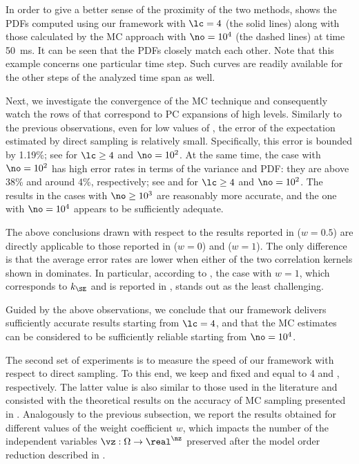 In order to give a better sense of the proximity of the two methods,
 shows the \acp{PDF} computed using our
framework with $\lc = 4$ (the solid lines) along with those calculated by the
\ac{MC} approach with $\no = 10^4$ (the dashed lines) at time 50~ms. It can be
seen that the \acp{PDF} closely match each other. Note that this example
concerns one particular time step. Such curves are readily available for the
other steps of the analyzed time span as well.

Next, we investigate the convergence of the \ac{MC} technique and consequently
watch the rows of  that correspond to \ac{PC}
expansions of high levels. Similarly to the previous observations, even for low
values of \no, the error of the expectation estimated by direct sampling is
relatively small. Specifically, this error is bounded by 1.19\%; see
\error{\expectation} for $\lc \geq 4$ and $\no = 10^2$. At the same time, the
case with $\no = 10^2$ has high error rates in terms of the variance and
\ac{PDF}: they are above 38\% and around 4\%, respectively; see
\error{\variance} and  for $\lc \geq 4$ and $\no = 10^2$. The results
in the cases with $\no \geq 10^3$ are reasonably more accurate, and the one with
$\no = 10^4$ appears to be sufficiently adequate.

The above conclusions drawn with respect to the results reported in
 ($w = 0.5$) are directly applicable to those
reported in  ($w = 0$) and
 ($w = 1$). The only difference is that the
average error rates are lower when either of the two correlation kernels shown
in  dominates. In particular, according to
\error{\variance}, the case with $w = 1$, which corresponds to $k_\SE$ and is
reported in , stands out as the least
challenging.

Guided by the above observations, we conclude that our framework delivers
sufficiently accurate results starting from $\lc = 4$, and that the \ac{MC}
estimates can be considered to be sufficiently reliable starting from $\no =
10^4$.


The second set of experiments is to measure the speed of our framework with
respect to direct sampling. To this end, we keep \lc and \no fixed and equal to
4 and , respectively. The latter value is also similar to those
used in the literature \cite{ghanta2006, bhardwaj2008, huang2009a, shen2009,
xiang2010, juan2012, lee2013} and consisted with the theoretical results on the
accuracy of \ac{MC} sampling presented in \cite{diaz-emparanza2002}. Analogously
to the previous subsection, we report the results obtained for different values
of the weight coefficient $w$, which impacts the number of the independent
variables $\vz: \Omega \to \real^\nz$ preserved after the model order reduction
described in .

